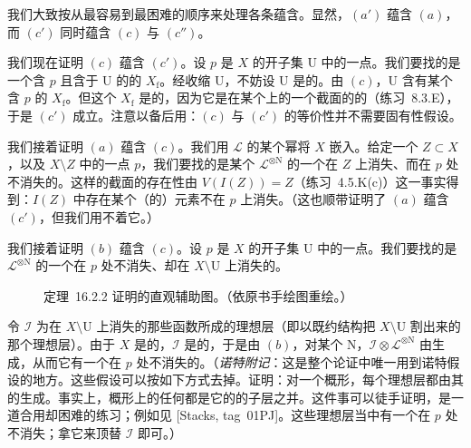 我们大致按从最容易到最困难的顺序来处理各条蕴含。显然，$(a')$ 蕴含 $(a)$，而 $(c')$ 同时蕴含 $(c)$ 与 $(c'')$。

我们现在证明 $(c)$ 蕴含 $(c')$。设 $p$ 是 $X$ 的开子集 $\mathrm{U}$ 中的一点。我们要找的是一个含 $p$ 且含于 $\mathrm{U}$ 的\emph{\trAffine}的 $X_{\mathrm{f}}$。经收缩 $\mathrm{U}$，不妨设 $\mathrm{U}$ 是\trAffine{}的。由 $(c)$，$\mathrm{U}$ 含有某个含 $p$ 的 $X_{\mathrm{f}}$。但这个 $X_{\mathrm{f}}$ 是\trAffine{}的，因为它是\trLineBundle{}在某个\trAffineScheme{}上的一个截面的\trVanishingSet{}的\trComplement（\mbox{练习~8.3.E}），于是 $(c')$ 成立。注意以备后用：$(c)$ 与 $(c')$ 的等价性并不需要固有性假设。

我们接着证明 $(a)$ 蕴含 $(c)$。我们用 $\mathscr{L}$ 的某个幂将 $X$ 嵌入\trProjectiveSpace。给定一个\trClosedSubset{} $Z\subset X$，以及\trComplement{} $X\setminus Z$ 中的一点 $p$，我们要找的是某个 $\mathscr{L}^{\otimes\mathrm{N}}$ 的一个在 $Z$ 上消失、而在 $p$ 处不消失的\trSection。这样的截面的存在性由 $V(I(Z))=Z$（\mbox{练习~4.5.K}(c)）这一事实得到：$I(Z)$ 中存在某个（\trHomogeneous{}的）元素不在 $p$ 上消失。（这也顺带证明了 $(a)$ 蕴含 $(c')$，但我们用不着它。）

我们接着证明 $(b)$ 蕴含 $(c)$。设 $p$ 是 $X$ 的开子集 $\mathrm{U}$ 中的一点。我们要找的是 $\mathscr{L}^{\otimes\mathrm{N}}$ 的一个在 $p$ 处不消失、却在 $X\setminus\mathrm{U}$ 上消失的\trSection。

\begin{figure}[htbp]
\centering
{}
\caption{\mbox{定理~16.2.2} 证明的直观辅助图。（依原书手绘图重绘。）}\label{fig:ample-visual-aid}
\end{figure}

令 $\mathscr{I}$ 为在 $X\setminus\mathrm{U}$ 上消失的那些函数所成的理想层（即以既约结构把 $X\setminus\mathrm{U}$ 割出来的那个\trQC{}理想层）。由于 $X$ 是\trNoether{}的，$\mathscr{I}$ 是\trFiniteType{}的，于是由 $(b)$，对某个 $\mathrm{N}$，$\mathscr{I}\otimes\mathscr{L}^{\otimes\mathrm{N}}$ 由\trGlobalSections{}生成，从而它有一个在 $p$ 处不消失的\trGlobalSections。（\emph{诺特附记}：这是整个论证中唯一用到诺特假设的地方。这些假设可以按如下方式去掉。证明：对一个\trQuasicompact\trQuasiSeparated{}概形，每个理想层都由其\trFiniteType{}的\trSubidealSheaf{}生成。事实上，\trQuasicompact\trQuasiSeparated{}概形上的任何\trQCSheaf{}都是它的\trFiniteType{}的\trQC{}子层之并。这件事可以徒手证明，是一道合用却困难的练习；例如见 [Stacks, tag~01PJ]。这些\trFiniteType{}理想层当中有一个在 $p$ 处不消失；拿它来顶替 $\mathscr{I}$ 即可。）

